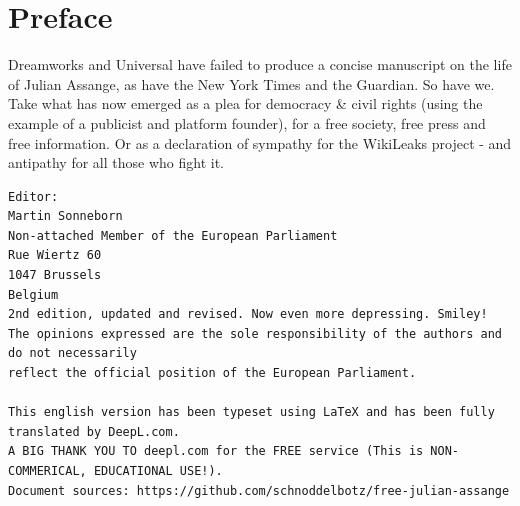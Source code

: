 



\renewcommand{\thechapter}{\Roman{chapter}}
\renewcommand{\thesection}{\Roman{section}}
\addtolength{\cftsecnumwidth}{10pt}
\addtolength{\cftchapnumwidth}{10pt}


\maketitle %

\chapter*{Preface}
\thispagestyle{empty} %
Dreamworks and Universal have failed to produce a concise manuscript on the life of Julian Assange, as have the New York Times and the Guardian.
So have we.
Take what has now emerged as a plea for democracy \& civil rights (using the example of a publicist and platform founder), for a free society, free press and free information.
Or as a declaration of sympathy for the WikiLeaks project - and antipathy for all those who fight it.


\vspace*{\fill}
\begin{verbatim}
Editor:
Martin Sonneborn
Non-attached Member of the European Parliament
Rue Wiertz 60
1047 Brussels
Belgium
2nd edition, updated and revised. Now even more depressing. Smiley!
The opinions expressed are the sole responsibility of the authors and do not necessarily 
reflect the official position of the European Parliament.

This english version has been typeset using LaTeX and has been fully translated by DeepL.com.
A BIG THANK YOU TO deepl.com for the FREE service (This is NON-COMMERICAL, EDUCATIONAL USE!).
Document sources: https://github.com/schnoddelbotz/free-julian-assange
\end{verbatim}

